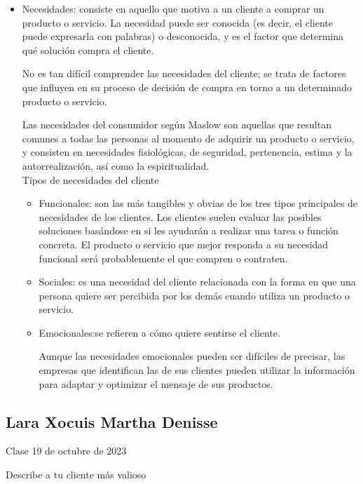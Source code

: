 \documentclass[letterpaper,12pt]{article}
\begin{document}
\begin{sloppypar}
\begin{itemize}
    \item Necesidades:  consiste en aquello que motiva a un cliente a comprar un producto o servicio. La necesidad puede ser conocida (es decir, el cliente puede expresarla con palabras) o desconocida, y es el factor que determina qué solución compra el cliente.
    
    No es tan difícil comprender las necesidades del cliente; se trata de factores que influyen en su proceso de decisión de compra en torno a un determinado producto o servicio.

    Las necesidades del consumidor según Maslow son aquellas que resultan comunes a todas las personas al momento de adquirir un producto o servicio, y consisten en necesidades fisiológicas, de seguridad, pertenencia, estima y la autorrealización, así como la espiritualidad.
    \vspace{0.3cm}\\ 
    Tipos de necesidades del cliente 
    \begin{itemize}
        \item Funcionales: son las más tangibles y obvias de los tres tipos principales de necesidades de los clientes. Los clientes suelen evaluar las posibles soluciones basándose en si les ayudarán a realizar una tarea o función concreta. El producto o servicio que mejor responda a su necesidad funcional será probablemente el que compren o contraten.
        \item Sociales:  es una necesidad del cliente relacionada con la forma en que una persona quiere ser percibida por los demás cuando utiliza un producto o servicio. 
        \item Emocionales:se refieren a cómo quiere sentirse el cliente.

        Aunque las necesidades emocionales pueden ser difíciles de precisar, las empresas que identifican las de sus clientes pueden utilizar la información para adaptar y optimizar el mensaje de sus productos.
    \end{itemize}

\end{itemize}
\newpage
\subsection*{Lara Xocuis Martha Denisse}
Clase 19 de octubre de 2023

Describe a tu cliente más valioso


\end{sloppypar}
\end{document}
